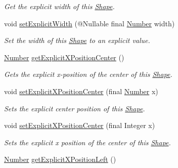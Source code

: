 \begin{DoxyCompactItemize}
\begin{DoxyCompactList}\small\item\em Get the explicit width of this \hyperlink{classcom_1_1aarrelaakso_1_1drawl_1_1_shape}{Shape}. \end{DoxyCompactList}\item 
void \hyperlink{classcom_1_1aarrelaakso_1_1drawl_1_1_shape_a386685477bfc007aab782565f140265d}{set\+Explicit\+Width} (@Nullable final \hyperlink{interfacecom_1_1aarrelaakso_1_1drawl_1_1_number}{Number} width)
\begin{DoxyCompactList}\small\item\em Set the width of this \hyperlink{classcom_1_1aarrelaakso_1_1drawl_1_1_shape}{Shape} to an explicit value. \end{DoxyCompactList}\item 
\hyperlink{interfacecom_1_1aarrelaakso_1_1drawl_1_1_number}{Number} \hyperlink{classcom_1_1aarrelaakso_1_1drawl_1_1_shape_aa1fbd5a290bc5d2df437f0bd79f30a89}{get\+Explicit\+X\+Position\+Center} ()
\begin{DoxyCompactList}\small\item\em Gets the explicit x-\/position of the center of this \hyperlink{classcom_1_1aarrelaakso_1_1drawl_1_1_shape}{Shape}. \end{DoxyCompactList}\item 
void \hyperlink{classcom_1_1aarrelaakso_1_1drawl_1_1_shape_a28c766b414be0cd8767093f9be557dbd}{set\+Explicit\+X\+Position\+Center} (final \hyperlink{interfacecom_1_1aarrelaakso_1_1drawl_1_1_number}{Number} x)
\begin{DoxyCompactList}\small\item\em Sets the explicit center position of this \hyperlink{classcom_1_1aarrelaakso_1_1drawl_1_1_shape}{Shape}. \end{DoxyCompactList}\item 
void \hyperlink{classcom_1_1aarrelaakso_1_1drawl_1_1_shape_a271cd9377952616a30a434b22e22000a}{set\+Explicit\+X\+Position\+Center} (final Integer x)
\begin{DoxyCompactList}\small\item\em Sets the explicit x position of the center of this \hyperlink{classcom_1_1aarrelaakso_1_1drawl_1_1_shape}{Shape}. \end{DoxyCompactList}\item 
\hyperlink{interfacecom_1_1aarrelaakso_1_1drawl_1_1_number}{Number} \hyperlink{classcom_1_1aarrelaakso_1_1drawl_1_1_shape_abd7f6c77e2c62100bb72d8ad3085e288}{get\+Explicit\+X\+Position\+Left} ()

\end{DoxyCompactItemize}
